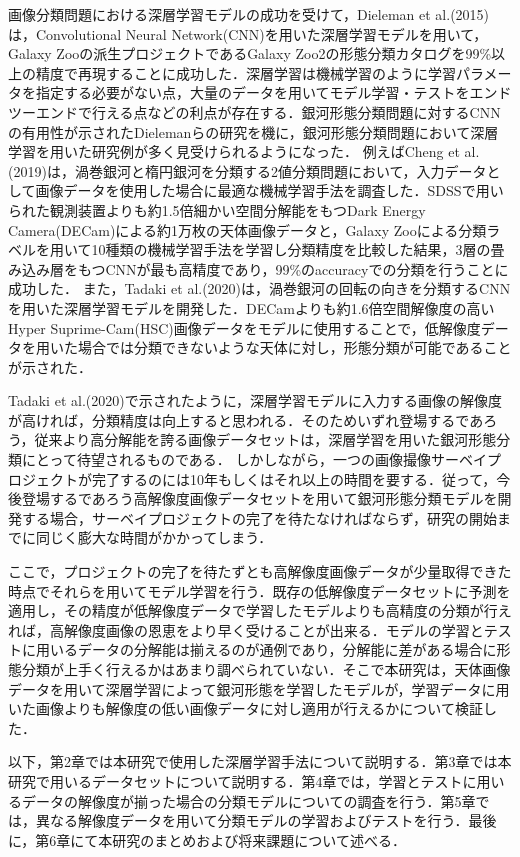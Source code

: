 \documentclass[a4j, 11pt]{jreport}
\begin{document}
画像分類問題における深層学習モデルの成功を受けて，Dieleman et al.(2015)\cite{Dieleman2015}は，Convolutional Neural Network(CNN)を用いた深層学習モデルを用いて，Galaxy Zooの派生プロジェクトであるGalaxy Zoo2の形態分類カタログを99\%以上の精度で再現することに成功した．深層学習は機械学習のように学習パラメータを指定する必要がない点，大量のデータを用いてモデル学習・テストをエンドツーエンドで行える点などの利点が存在する．銀河形態分類問題に対するCNNの有用性が示されたDielemanらの研究を機に，銀河形態分類問題において深層学習を用いた研究例が多く見受けられるようになった．
例えばCheng et al.(2019)\cite{Cheng2019}は，渦巻銀河と楕円銀河を分類する2値分類問題において，入力データとして画像データを使用した場合に最適な機械学習手法を調査した．SDSSで用いられた観測装置よりも約1.5倍細かい空間分解能をもつDark Energy Camera(DECam)による約1万枚の天体画像データと，Galaxy Zooによる分類ラベルを用いて10種類の機械学習手法を学習し分類精度を比較した結果，3層の畳み込み層をもつCNNが最も高精度であり，99\%のaccuracyでの分類を行うことに成功した．
また，Tadaki et al.(2020)\cite{Tadaki2020}は，渦巻銀河の回転の向きを分類するCNNを用いた深層学習モデルを開発した．DECamよりも約1.6倍空間解像度の高いHyper Suprime-Cam(HSC)画像データをモデルに使用することで，低解像度データを用いた場合では分類できないような天体に対し，形態分類が可能であることが示された．

Tadaki et al.(2020)で示されたように，深層学習モデルに入力する画像の解像度が高ければ，分類精度は向上すると思われる．そのためいずれ登場するであろう，従来より高分解能を誇る画像データセットは，深層学習を用いた銀河形態分類にとって待望されるものである．
しかしながら，一つの画像撮像サーベイプロジェクトが完了するのには10年もしくはそれ以上の時間を要する．従って，今後登場するであろう高解像度画像データセットを用いて銀河形態分類モデルを開発する場合，サーベイプロジェクトの完了を待たなければならず，研究の開始までに同じく膨大な時間がかかってしまう．

ここで，プロジェクトの完了を待たずとも高解像度画像データが少量取得できた時点でそれらを用いてモデル学習を行う．既存の低解像度データセットに予測を適用し，その精度が低解像度データで学習したモデルよりも高精度の分類が行えれば，高解像度画像の恩恵をより早く受けることが出来る．モデルの学習とテストに用いるデータの分解能は揃えるのが通例であり，分解能に差がある場合に形態分類が上手く行えるかはあまり調べられていない．そこで本研究は，天体画像データを用いて深層学習によって銀河形態を学習したモデルが，学習データに用いた画像よりも解像度の低い画像データに対し適用が行えるかについて検証した．

以下，第2章では本研究で使用した深層学習手法について説明する．第3章では本研究で用いるデータセットについて説明する．第4章では，学習とテストに用いるデータの解像度が揃った場合の分類モデルについての調査を行う．第5章では，異なる解像度データを用いて分類モデルの学習およびテストを行う．最後に，第6章にて本研究のまとめおよび将来課題について述べる．
\end{document}
